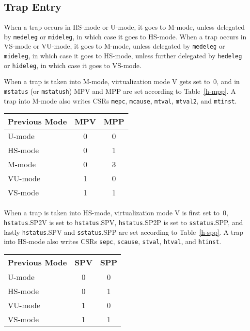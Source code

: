 \subsection{Trap Entry}

When a trap occurs in HS-mode or U-mode, it goes to M-mode, unless
delegated by {\tt medeleg} or {\tt mideleg}, in which case it goes to HS-mode.
When a trap occurs in VS-mode or VU-mode, it goes to M-mode, unless
delegated by {\tt medeleg} or {\tt mideleg}, in which case it goes to HS-mode,
unless further delegated by {\tt hedeleg} or {\tt hideleg}, in which case it
goes to VS-mode.

When a trap is taken into M-mode, virtualization mode V gets set to~0,
and in {\tt mstatus} (or {\tt mstatush}) MPV and MPP are set according to
Table~\ref{h-mpp}.
A trap into M-mode also writes CSRs {\tt mepc}, {\tt mcause},
{\tt mtval}, {\tt mtval2}, and {\tt mtinst}.

\begin{table*}[h!]
\begin{center}
\begin{tabular}{|l|c|c|}
  \hline
  Previous Mode & MPV & MPP \\ \hline
  U-mode        & 0   & 0   \\
  HS-mode       & 0   & 1   \\
  M-mode        & 0   & 3   \\ \hline
  VU-mode       & 1   & 0   \\
  VS-mode       & 1   & 1   \\ \hline
\end{tabular}
\end{center}
\caption{Value of {\tt mstatus}/{\tt mstatush} fields MPV and MPP after a trap into M-mode.
Upon trap return, MPV is ignored when MPP=3.}
\label{h-mpp}
\end{table*}

When a trap is taken into HS-mode, virtualization mode V is first set to~0,
{\tt hstatus}.SP2V is set to {\tt hstatus}.SPV, {\tt hstatus}.SP2P is set
to {\tt sstatus}.SPP, and lastly {\tt hstatus}.SPV and {\tt sstatus}.SPP are
set according to Table~\ref{h-spp}.
A trap into HS-mode also writes CSRs {\tt sepc}, {\tt scause},
{\tt stval}, {\tt htval}, and {\tt htinst}.

\begin{table*}[h!]
\begin{center}
\begin{tabular}{|l|c|c|}
  \hline
  Previous Mode & SPV & SPP \\ \hline
  U-mode        & 0   & 0   \\
  HS-mode       & 0   & 1   \\ \hline
  VU-mode       & 1   & 0   \\
  VS-mode       & 1   & 1   \\ \hline
\end{tabular}
\end{center}
\caption{Value of {\tt hstatus} field SPV and {\tt sstatus} field SPP after a trap into HS-mode.}
\label{h-spp}
\end{table*}

